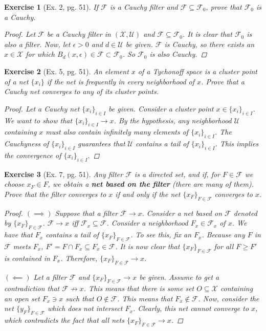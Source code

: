 \documentclass[11pt]{article}
\newtheorem{exercise}{Exercise}
\newcommand{\F}{\mathcal{F}}
\newcommand{\X}{\mathcal{X}}
\begin{document}
\begin{exercise}[Ex. 2, pg. 51]
	If $\F$ is a Cauchy filter and $\F \subseteq \F_0$, prove that $\F_0$ is a Cauchy.

	\begin{proof}
		Let $\F$ be a Cauchy filter in $(\X,\mathcal{U})$ and $\F \subseteq \F_0$. It is clear that $\F_0$ is also a filter. Now, let $\epsilon > 0$ and $d\in \mathcal{U}$ be given. $\F$ is Cauchy, so there exists an $x\in \X$ for which $B_d(x,\epsilon) \in \F \subset \F_0$. So $\F_0$ is also Cauchy. 
	\end{proof}
\end{exercise}

\begin{exercise}[Ex. 5, pg. 51]
	An element $x$ of a Tychonoff space is a cluster point of a net $\{x_i\}$ if the net is frequently in every neighborhood of $x$. Prove that a Cauchy net converges to any of its cluster points.
	\begin{proof}
		Let a Cauchy net $\{ x_i\}_{i\in I}$ be given. Consider a cluster point $x\in \{ x_i\}_{i\in I}$. We want to show that $\{x_i\}_{i\in I} \to x$. By the hypothesis, any neighborhood $\mathcal{U}$ containing $x$ must also contain infinitely many elements of $\{x_i\}_{i\in I}$. The Cauchyness of $\{x_i\}_{i\in I}$ guarantees that $\mathcal{U}$ contains a tail of $\{x_i\}_{i\in I}$. This implies the convergence of $\{x_i\}_{i\in I}$.  
	\end{proof}
\end{exercise}

\begin{exercise}[Ex. 7, pg. 51]
	Any filter $\F$ is a directed set, and if, for $F \in \F$ we choose $x_F \in F$, we obtain a \textbf{net based on the filter} (there are many of them). Prove that the filter converges to $x$ if and only if the net $\{x_F\}_{F\in \F}$ converges to $x$.
	\begin{proof}
		$(\implies)$ Suppose that a filter $\F\to x$. Consider a net based on $\F$ denoted by $\{x_F\}_{F\in \F}$. $\F \to x$ iff $\F_x \subseteq \F$. Consider a neighborhood $F_x \in \F_x$ of $x$. We have that $F_x$ contains a tail of $\{x_F\}_{F\in \F}$. To see this, fix an $F_x$. Because any $F$ in $\F$ meets $F_x$, $F' = F\cap F_x \subseteq F_x \in \F$. It is now clear that $\{ x_{F}\}_{F\in \F}$ for all $F \geq F'$ is contained in $F_x$. Therefore, $\{x_F\}_{F\in \F} \to x$.  
		
		$(\impliedby)$ Let a filter $\F$ and $\{x_F\}_{F\in \F} \to x$ be given. Assume to get a contradiction that $\F \not\to x$. This means that there is some set $O\subseteq \X$ containing an open set $F_x \ni x$ such that $O \notin \F$. This means that $F_x \notin \F$. Now, consider the net $\{ y_F\}_{F\in \F}$ which does not intersect $F_x$. Clearly, this net cannot converge to $x$, which contradicts the fact that all nets $\{x_F\}_{F\in \F} \to x$.
	\end{proof}
\end{exercise}



\end{document}
